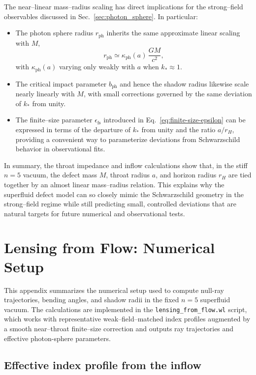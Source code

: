 \documentclass[11pt]{article}
\begin{document}
The near--linear mass--radius scaling has direct implications for the
strong--field observables discussed in Sec.~\ref{sec:photon_sphere}.  In
particular:
\begin{itemize}
  \item The photon sphere radius \(r_{\text{ph}}\) inherits the same
        approximate linear scaling with \(M\),
        \[
          r_{\text{ph}}
          \simeq \kappa_{\text{ph}}(a)\, \frac{G M}{c^2},
        \]
        with \(\kappa_{\text{ph}}(a)\) varying only weakly with \(a\) when
        \(k_* \approx 1\).
  \item The critical impact parameter \(b_{\text{ph}}\) and hence the
        shadow radius likewise scale nearly linearly with \(M\), with small
        corrections governed by the same deviation of \(k_*\) from unity.
  \item The finite--size parameter \(\epsilon_{\text{fs}}\) introduced in
        Eq.~\eqref{eq:finite-size-epsilon} can be expressed in terms of the
        departure of \(k_*\) from unity and the ratio \(a/r_H\), providing a
        convenient way to parameterize deviations from Schwarzschild
        behavior in observational fits.
\end{itemize}

In summary, the throat impedance and inflow calculations show that, in the
stiff \(n=5\) vacuum, the defect mass \(M\), throat radius \(a\), and
horizon radius \(r_H\) are tied together by an almost linear mass--radius
relation.  This explains why the superfluid defect model can so closely
mimic the Schwarzschild geometry in the strong--field regime while still
predicting small, controlled deviations that are natural targets for future
numerical and observational tests.

\section{Lensing from Flow: Numerical Setup}
\label{app:lensing_numerics}

This appendix summarizes the numerical setup used to compute null-ray
trajectories, bending angles, and shadow radii in the fixed \(n=5\)
superfluid vacuum.  The calculations are implemented in the
\texttt{lensing\_from\_flow.wl} script, which works with representative
weak--field--matched index profiles augmented by a smooth near--throat
finite--size correction and outputs ray trajectories and effective
photon-sphere parameters.

\subsection{Effective index profile from the inflow}
\label{app:lensing-index}
\end{document}
